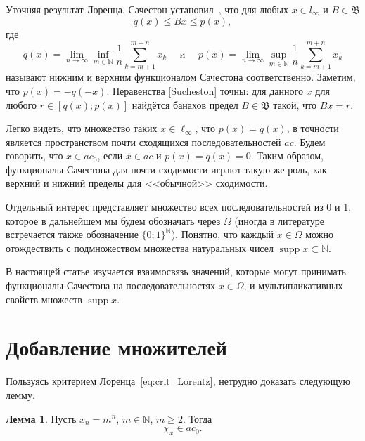 \documentclass[a4paper,openbib]{article}
\renewcommand{\geq}{\geqslant} %
\DeclareMathOperator{\supp}{supp}
\theoremstyle{definition}
\newtheorem{lemma}{Лемма}[section]
\begin{document}
Уточняя результат Лоренца, Сачестон установил~\cite{sucheston1967banach}, что
для любых $x\in l_\infty$ и $B\in\mathfrak{B}$
\begin{equation}\label{Sucheston}
	q(x) \leqslant Bx \leqslant p(x)
	,
\end{equation}
где
\begin{equation*}
	q(x) = \lim_{n\to\infty} \inf_{m\in\mathbb{N}}  \frac{1}{n} \sum_{k=m+1}^{m+n} x_k
	\mbox{~~~~и~~~~}
	p(x) = \lim_{n\to\infty} \sup_{m\in\mathbb{N}}  \frac{1}{n} \sum_{k=m+1}^{m+n} x_k
\end{equation*}
называют нижним и верхним функционалом Сачестона соответственно.
Заметим, что $p(x) = -q(-x)$.
Неравенства \eqref{Sucheston} точны:
для данного $x$ для любого $r\in[q(x); p(x)]$ найдётся банахов предел
$B\in\mathfrak{B}$ такой, что $Bx = r$.

Легко видеть, что множество таких $x\in\ell_\infty$, что $p(x)=q(x)$,
в точности является пространством почти сходящихся последовательностей $ac$.
Будем говорить, что $x\in ac_0$, если $x\in ac$ и $p(x)=q(x)=0$.
Таким образом, функционалы Сачестона для почти сходимости играют такую же роль,
как верхний и нижний пределы для <<обычной>> сходимости.


Отдельный интерес представляет множество всех последовательностей из 0 и 1,
которое в дальнейшем мы будем обозначать через $\Omega$
(иногда в литературе~\cite{Semenov2014geomprops} встречается также обозначение $\{0;1\}^\mathbb{N}$).
Понятно, что каждый $x\in \Omega$ можно отождествить с подмножеством множества натуральных чисел
$\supp x \subset \mathbb{N}$.

В настоящей статье изучается взаимосвязь значений, которые могут принимать функционалы Сачестона
на последовательностях $x\in \Omega$, и мультипликативных свойств множеств $\supp x$.





\section{Добавление множителей}

Пользуясь критерием Лоренца~\eqref{eq:crit_Lorentz},
нетрудно доказать следующую лемму.

\begin{lemma}
	\label{lem:simple_powers_in_ac0}
	Пусть $x_n = m^n$, $m\in\mathbb{N}$, $m\geq 2$.
	Тогда
	\begin{equation}
		\chi_x \in ac_0
		.
	\end{equation}
\end{lemma}
\end{document}
